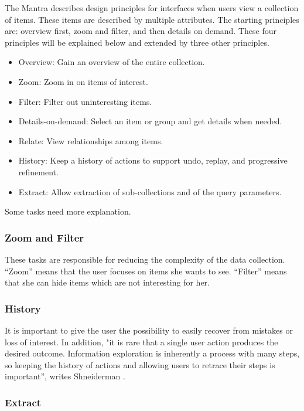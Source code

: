 \documentclass[11pt]{report}
\begin{document}
The Mantra describes design principles for interfaces when users view a collection of items. These items are described by multiple attributes. The starting principles are: overview first, zoom and filter, and then details on demand. These four principles will be explained below and extended by three other principles.
\begin{itemize}
	\item Overview: Gain an overview of the entire collection.
	\item Zoom: Zoom in on items of interest.
	\item Filter: Filter out uninteresting items.
	\item Details-on-demand: Select an item or group and get details when needed.
	\item Relate: View relationships among items.
	\item History: Keep a history of actions to support undo, replay, and progressive refinement.
	\item Extract: Allow extraction of sub-collections and of the query parameters.
\end{itemize}

Some tasks need more explanation.

\subsubsection{Zoom and Filter}

These tasks are responsible for reducing the complexity of the data collection. ``Zoom'' means that the user focuses on items she wants to see. ``Filter'' means that she can hide items which are not interesting for her.

\subsubsection{History}

It is important to give the user the possibility to easily recover from mistakes or loss of interest. In addition, "it is rare that a single user action produces the desired outcome. Information exploration is inherently a process with many steps, so keeping the history of actions and allowing users to retrace their steps is important”, writes Shneiderman \cite{Shneiderman1996}.

\subsubsection{Extract}
\end{document}
